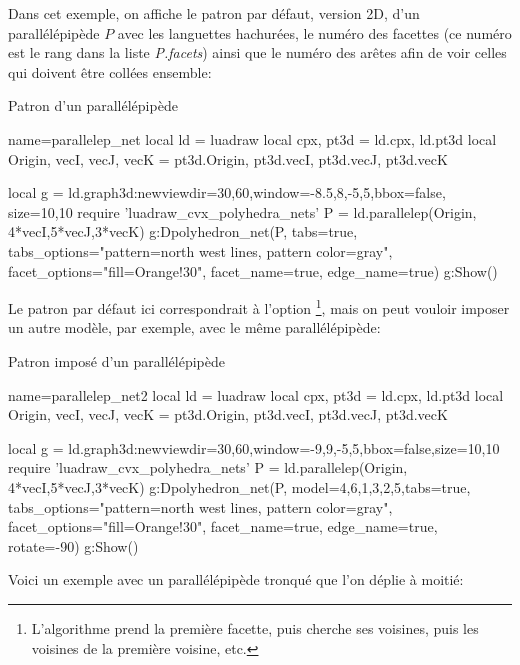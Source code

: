Dans cet exemple, on affiche le patron par défaut, version 2D,  d'un parallélépipède $P$ avec les languettes hachurées, le numéro des facettes (ce numéro est le rang dans la liste \emph{P.facets}) ainsi que le numéro des arêtes afin de voir celles qui doivent être collées ensemble:

\begin{demo}{Patron d'un parallélépipède}
\begin{luadraw}{name=parallelep_net}
local ld = luadraw
local cpx, pt3d = ld.cpx, ld.pt3d
local Origin, vecI, vecJ, vecK = pt3d.Origin, pt3d.vecI, pt3d.vecJ, pt3d.vecK

local g = ld.graph3d:new{viewdir={30,60},window={-8.5,8,-5,5},bbox=false, size={10,10}}
require 'luadraw_cvx_polyhedra_nets'
P = ld.parallelep(Origin, 4*vecI,5*vecJ,3*vecK)
g:Dpolyhedron_net(P, {tabs=true, tabs_options="pattern=north west lines, pattern color=gray",
  facet_options="fill=Orange!30", facet_name=true, edge_name=true})
g:Show()
\end{luadraw}
\end{demo}

Le patron par défaut ici correspondrait à l'option \footnote{L'algorithme prend la première facette, puis cherche ses voisines, puis les voisines de la première voisine, etc.}, mais on peut vouloir imposer un autre modèle, par exemple, avec le même parallélépipède:

\begin{demo}{Patron imposé d'un parallélépipède}
\begin{luadraw}{name=parallelep_net2}
local ld = luadraw
local cpx, pt3d = ld.cpx, ld.pt3d
local Origin, vecI, vecJ, vecK = pt3d.Origin, pt3d.vecI, pt3d.vecJ, pt3d.vecK

local g = ld.graph3d:new{viewdir={30,60},window={-9,9,-5,5},bbox=false,size={10,10}}
require 'luadraw_cvx_polyhedra_nets'
P = ld.parallelep(Origin, 4*vecI,5*vecJ,3*vecK)
g:Dpolyhedron_net(P, {model={{4,6,1,3,2,5}},tabs=true, 
  tabs_options="pattern=north west lines, pattern color=gray", 
  facet_options="fill=Orange!30", facet_name=true, 
 edge_name=true, rotate=-90})
g:Show()
\end{luadraw}
\end{demo}

Voici un exemple avec un parallélépipède tronqué que l'on déplie à moitié:

